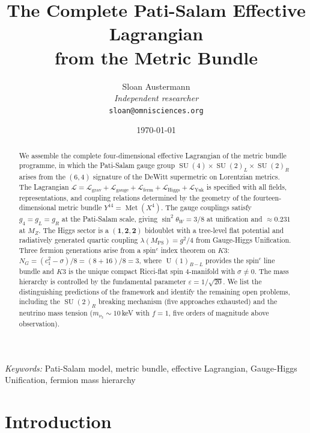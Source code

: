\documentclass[12pt,a4paper]{article}
\title{\textbf{The Complete Pati-Salam Effective Lagrangian\\ from the Metric Bundle}}
\author{Sloan Austermann\\[4pt]
\small\textit{Independent researcher}\\
\small\texttt{sloan@omnisciences.org}}
\date{\today}
\theoremstyle{definition}
\newcommand{\Met}{\operatorname{Met}}
\newcommand{\SU}{\operatorname{SU}}
\newcommand{\U}{\operatorname{U}}
\newcommand{\MPS}{M_{\mathrm{PS}}}
\begin{document}
\maketitle

\begin{abstract}
We assemble the complete four-dimensional effective Lagrangian of the metric bundle programme, in which the Pati-Salam gauge group $\SU(4) \times \SU(2)_L \times \SU(2)_R$ arises from the $(6,4)$ signature of the DeWitt supermetric on Lorentzian metrics.
The Lagrangian $\mathcal{L} = \mathcal{L}_{\mathrm{grav}} + \mathcal{L}_{\mathrm{gauge}} + \mathcal{L}_{\mathrm{ferm}} + \mathcal{L}_{\mathrm{Higgs}} + \mathcal{L}_{\mathrm{Yuk}}$ is specified with all fields, representations, and coupling relations determined by the geometry of the fourteen-dimensional metric bundle $Y^{14} = \Met(X^4)$.
The gauge couplings satisfy $g_4 = g_L = g_R$ at the Pati-Salam scale, giving $\sin^2\theta_W = 3/8$ at unification and $\approx 0.231$ at $M_Z$.
The Higgs sector is a $(\mathbf{1},\mathbf{2},\mathbf{2})$ bidoublet with a tree-level flat potential and radiatively generated quartic coupling $\lambda(\MPS) = g^2/4$ from Gauge-Higgs Unification.
Three fermion generations arise from a spin$^c$ index theorem on $K3$: $N_G = (c_1^2 - \sigma)/8 = (8+16)/8 = 3$, where $\U(1)_{B-L}$ provides the spin$^c$ line bundle and $K3$ is the unique compact Ricci-flat spin 4-manifold with $\sigma \neq 0$.
The mass hierarchy is controlled by the fundamental parameter $\varepsilon = 1/\sqrt{20}$.
We list the distinguishing predictions of the framework and identify the remaining open problems, including the $\SU(2)_R$ breaking mechanism (five approaches exhausted) and the neutrino mass tension ($m_{\nu_3} \sim 10\,$keV with $f=1$, five orders of magnitude above observation).
\end{abstract}

\vspace{10pt}
\noindent\textit{Keywords:} Pati-Salam model, metric bundle, effective Lagrangian, Gauge-Higgs Unification, fermion mass hierarchy

\newpage
\tableofcontents
\newpage


\section{Introduction}
\label{sec:intro}
\end{document}
